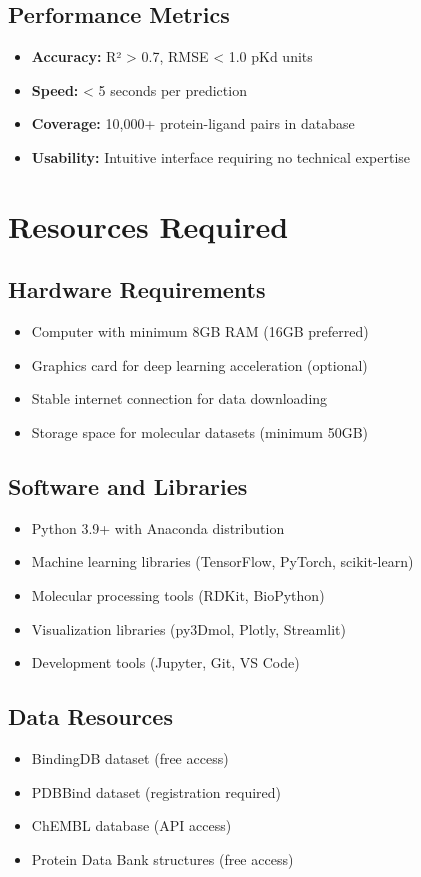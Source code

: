 \documentclass[12pt,a4paper]{article}
\begin{document}
\subsection{Performance Metrics}
\begin{itemize}
    \item \textbf{Accuracy:} R² > 0.7, RMSE < 1.0 pKd units
    \item \textbf{Speed:} < 5 seconds per prediction
    \item \textbf{Coverage:} 10,000+ protein-ligand pairs in database
    \item \textbf{Usability:} Intuitive interface requiring no technical expertise
\end{itemize}

\section{Resources Required}

\subsection{Hardware Requirements}
\begin{itemize}
    \item Computer with minimum 8GB RAM (16GB preferred)
    \item Graphics card for deep learning acceleration (optional)
    \item Stable internet connection for data downloading
    \item Storage space for molecular datasets (minimum 50GB)
\end{itemize}

\subsection{Software and Libraries}
\begin{itemize}
    \item Python 3.9+ with Anaconda distribution
    \item Machine learning libraries (TensorFlow, PyTorch, scikit-learn)
    \item Molecular processing tools (RDKit, BioPython)
    \item Visualization libraries (py3Dmol, Plotly, Streamlit)
    \item Development tools (Jupyter, Git, VS Code)
\end{itemize}

\subsection{Data Resources}
\begin{itemize}
    \item BindingDB dataset (free access)
    \item PDBBind dataset (registration required)
    \item ChEMBL database (API access)
    \item Protein Data Bank structures (free access)
\end{itemize}
\end{document}
